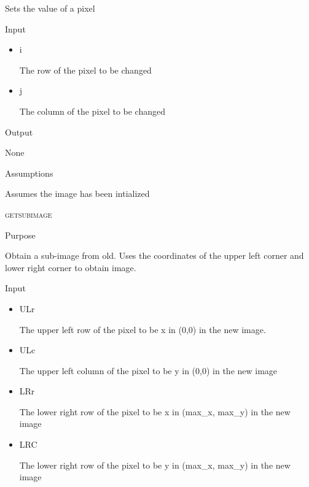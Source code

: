 \documentclass[pdftex, 11pt]{article}
\begin{document}
\begin{description}
\begin{description}
				Sets the value of a pixel

			\item{Input}

				\begin{itemize}

					\item{i}

						The row of the pixel to be changed

					\item{j}

						The column of the pixel to be changed

				\end{itemize}

			\item{Output}

				None

			\item{Assumptions}

				Assumes the image has been intialized

		\end{description}


	\item{\textsc{getsubimage}}
		\begin{description}
			\item{Purpose}

 				Obtain a sub-image from old.  Uses the coordinates
				of the upper left corner
				and lower right corner to obtain image.

			\item{Input}

				\begin{itemize}

					\item{ULr}
	
						The upper left row of the pixel
						to be x in (0,0) in the new image.

					\item{ULc}

						The upper left column of the pixel
						to be y in (0,0) in the new image

					\item{LRr}

						The lower right row of the pixel
						to be x in (max\_x, max\_y) in the
						new image

					\item{LRC}

						The lower right row of the pixel
						to be y in (max\_x, max\_y) in the
						new image


\end{itemize}
\end{description}
\end{description}
\end{document}
